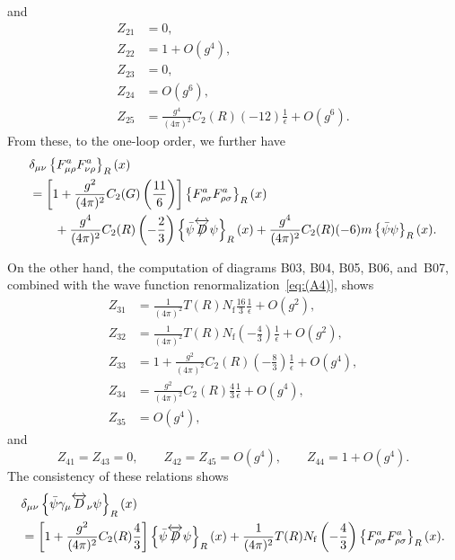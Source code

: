 and
\begin{align}
   Z_{21}
   &=0,
\label{eq:(A16)}\\
   Z_{22}
   &=1+O(g^4),
\label{eq:(A17)}\\
   Z_{23}
   &=0,
\label{eq:(A18)}\\
   Z_{24}
   &=O(g^6),
\label{eq:(A19)}\\
   Z_{25}
   &=\frac{g^4}{(4\pi)^2}C_2(R)(-12)\frac{1}{\epsilon}+O(g^6).
\label{eq:(A20)}
\end{align}
From these, to the one-loop order, we further have
\begin{align}
   &\delta_{\mu\nu}\left\{F_{\mu\rho}^aF_{\nu\rho}^a\right\}_R(x)
\notag\\
   &=\left[
   1+\frac{g^2}{(4\pi)^2}C_2(G)\left(\frac{11}{6}\right)\right]
   \left\{F_{\rho\sigma}^aF_{\rho\sigma}^a\right\}_R(x)
\notag\\
   &\qquad{}
   +\frac{g^4}{(4\pi)^2}C_2(R)\left(-\frac{2}{3}\right)
   \left\{\Bar{\psi}\overleftrightarrow{\Slash{D}}\psi\right\}_R(x)
   +\frac{g^4}{(4\pi)^2}C_2(R)(-6)
   m\left\{\Bar{\psi}\psi\right\}_R(x).
\label{eq:(A21)}
\end{align}

On the other hand, the computation of diagrams B03, B04, B05, B06, and~B07,
combined with the wave function renormalization~\eqref{eq:(A4)}, shows
\begin{align}
   Z_{31}
   &=\frac{1}{(4\pi)^2}T(R)N_{\mathrm{f}}
   \frac{16}{3}
   \frac{1}{\epsilon}+O(g^2),
\label{eq:(A22)}\\
   Z_{32}
   &=\frac{1}{(4\pi)^2}T(R)N_{\mathrm{f}}
   \left(-\frac{4}{3}\right)
   \frac{1}{\epsilon}+O(g^2),
\label{eq:(A23)}\\
   Z_{33}
   &=1+\frac{g^2}{(4\pi)^2}C_2(R)\left(-\frac{8}{3}\right)\frac{1}{\epsilon}
   +O(g^4),
\label{eq:(A24)}\\
   Z_{34}
   &=\frac{g^2}{(4\pi)^2}C_2(R)\frac{4}{3}\frac{1}{\epsilon}
   +O(g^4),
\label{eq:(A25)}\\
   Z_{35}
   &=O(g^4),
\label{eq:(A26)}
\end{align}
and
\begin{equation}
   Z_{41}=Z_{43}=0,\qquad Z_{42}=Z_{45}=O(g^4),\qquad Z_{44}=1+O(g^4).
\label{eq:(A27)}
\end{equation}
The consistency of these relations shows
\begin{align}
   &\delta_{\mu\nu}\left\{\Bar{\psi}\gamma_\mu\overleftrightarrow{D}_\nu
   \psi\right\}_R(x)
\notag\\
   &=\left[1+\frac{g^2}{(4\pi)^2}C_2(R)\frac{4}{3}\right]
   \left\{\Bar{\psi}\overleftrightarrow{\Slash{D}}
   \psi\right\}_R(x)
   +\frac{1}{(4\pi)^2}T(R)N_{\mathrm{f}}\left(-\frac{4}{3}\right)
   \left\{F_{\rho\sigma}^aF_{\rho\sigma}^a\right\}_R(x).
\label{eq:(A28)}
\end{align}

